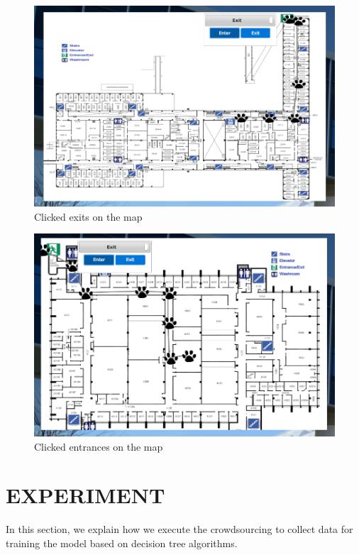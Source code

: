 \documentclass{sigchi}
\begin{document}
\begin{figure}[!h]
\centering
\includegraphics[width=1.0\columnwidth]{pics/map10.png}
\caption{Clicked exits on the map}
\label{fig:map10}
\end{figure}

\begin{figure}[!h]
\centering
\includegraphics[width=1.0\columnwidth]{pics/map11.png}
\caption{Clicked entrances on the map}
\label{fig:map11}
\end{figure}

\section{EXPERIMENT}

In this section, we explain how we execute the crowdsourcing to collect data for training the model based on decision tree algorithms.
\end{document}
